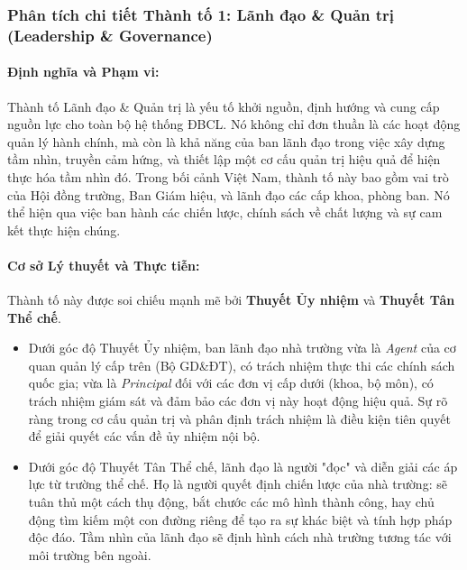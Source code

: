 \documentclass[12pt, a4paper, openany]{report}
\begin{document}
\subsubsection{Phân tích chi tiết Thành tố 1: Lãnh đạo \& Quản trị (Leadership \& Governance)}
\label{subsubsec:thanh_to_1}

\paragraph{Định nghĩa và Phạm vi:}
Thành tố Lãnh đạo \& Quản trị là yếu tố khởi nguồn, định hướng và cung cấp nguồn lực cho toàn bộ hệ thống ĐBCL. Nó không chỉ đơn thuần là các hoạt động quản lý hành chính, mà còn là khả năng của ban lãnh đạo trong việc xây dựng tầm nhìn, truyền cảm hứng, và thiết lập một cơ cấu quản trị hiệu quả để hiện thực hóa tầm nhìn đó. Trong bối cảnh Việt Nam, thành tố này bao gồm vai trò của Hội đồng trường, Ban Giám hiệu, và lãnh đạo các cấp khoa, phòng ban. Nó thể hiện qua việc ban hành các chiến lược, chính sách về chất lượng và sự cam kết thực hiện chúng.

\paragraph{Cơ sở Lý thuyết và Thực tiễn:}
Thành tố này được soi chiếu mạnh mẽ bởi \textbf{Thuyết Ủy nhiệm} và \textbf{Thuyết Tân Thể chế}.
\begin{itemize}
    \item Dưới góc độ Thuyết Ủy nhiệm, ban lãnh đạo nhà trường vừa là \textit{Agent} của cơ quan quản lý cấp trên (Bộ GD\&ĐT), có trách nhiệm thực thi các chính sách quốc gia; vừa là \textit{Principal} đối với các đơn vị cấp dưới (khoa, bộ môn), có trách nhiệm giám sát và đảm bảo các đơn vị này hoạt động hiệu quả. Sự rõ ràng trong cơ cấu quản trị và phân định trách nhiệm là điều kiện tiên quyết để giải quyết các vấn đề ủy nhiệm nội bộ.
    \item Dưới góc độ Thuyết Tân Thể chế, lãnh đạo là người "đọc" và diễn giải các áp lực từ trường thể chế. Họ là người quyết định chiến lược của nhà trường: sẽ tuân thủ một cách thụ động, bắt chước các mô hình thành công, hay chủ động tìm kiếm một con đường riêng để tạo ra sự khác biệt và tính hợp pháp độc đáo. Tầm nhìn của lãnh đạo sẽ định hình cách nhà trường tương tác với môi trường bên ngoài.
\end{itemize}
\end{document}
